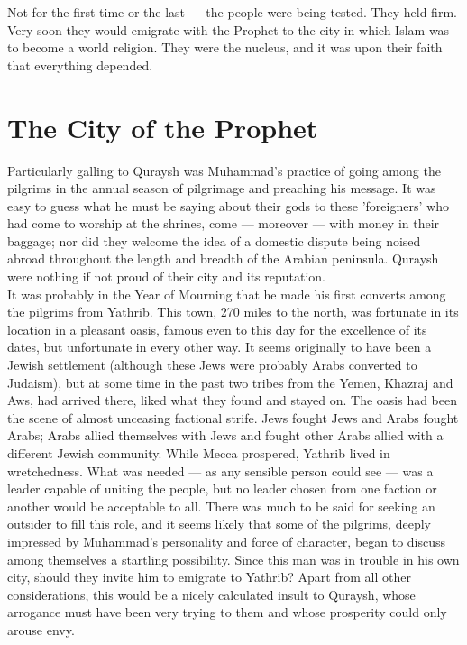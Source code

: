 \documentclass[10pt, twoside]{book}
\begin{document}
Not for the first time or the last --- the people were being tested. They held firm. Very soon they 
would emigrate with the Prophet to the city in which Islam was to become a world religion. They were 
the nucleus, and it was upon their faith that everything depended. \\

\chapter{The City of the Prophet}


Particularly galling to Quraysh was Muhammad's practice of going among the pilgrims in the annual 
season of pilgrimage and preaching his message. It was easy to guess what he must be saying about 
their gods to these 'foreigners' who had come to worship at the shrines, come --- moreover --- with money in their baggage; nor did they welcome the idea of a domestic dispute being noised abroad throughout the length and breadth of the Arabian peninsula. Quraysh were nothing if not proud of their city and its reputation. \\

It was probably in the Year of Mourning that he made his first converts among the pilgrims from 
Yathrib. This town, 270 miles to the north, was fortunate in its location in a pleasant oasis, famous 
even to this day for the excellence of its dates, but unfortunate in every other way. It seems 
originally to have been a Jewish settlement (although these Jews were probably Arabs converted to 
Judaism), but at some time in the past two tribes from the Yemen, Khazraj and Aws, had arrived there, 
liked what they found and stayed on. The oasis had been the scene of almost unceasing factional 
strife. Jews fought Jews and Arabs fought Arabs; Arabs allied themselves with Jews and fought other 
Arabs allied with a different Jewish community. While Mecca prospered, Yathrib lived in wretchedness. 
What was needed --- as any sensible person could see --- was a leader capable of uniting the people, but 
no leader chosen from one faction or another would be acceptable to all. There was much to be said 
for seeking an outsider to fill this role, and it seems likely that some of the pilgrims, deeply 
impressed by Muhammad's personality and force of character, began to discuss among themselves a 
startling possibility. Since this man was in trouble in his own city, should they invite him to 
emigrate to Yathrib? Apart from all other considerations, this would be a nicely calculated insult to 
Quraysh, whose arrogance must have been very trying to them and whose prosperity could only arouse 
envy. \\
\end{document}
